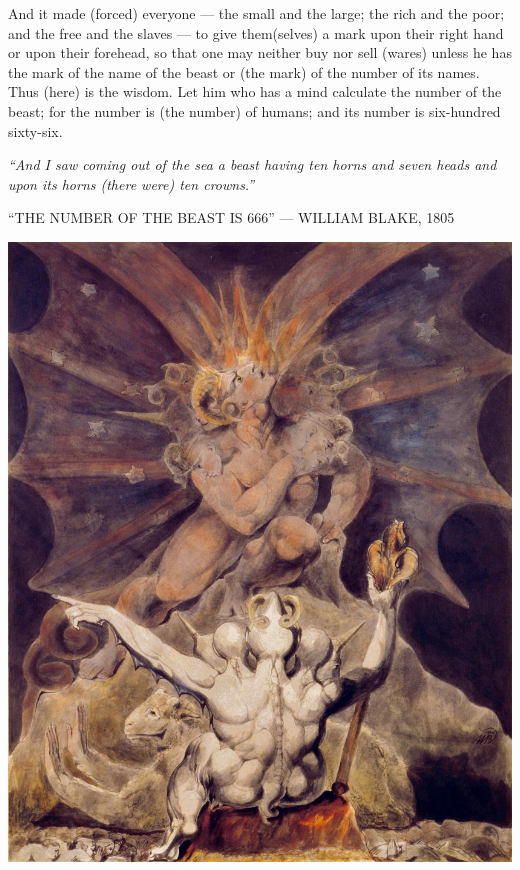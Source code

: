 \begin{pages}
\begin{Leftside}
		\pend
		\pstart
		And it made (forced) everyone — the small and the large; the rich and the poor; and the free and the slaves — to give them(selves) a mark upon their right hand or upon their forehead, so that one may neither buy nor sell (wares) unless he has the mark of the name of the beast or (the mark) of the number of its names. Thus (here) is the wisdom. Let him who has a mind calculate the number of the beast; for the number is (the number) of humans; and its number is six-hundred sixty-six. 
		\pend
        \endnumbering
    \end{Leftside}

\end{pages} 
\Pages

\clearpage
\thispagestyle{empty}
\null\vfill
\settowidth{}
\begin{center}
\parbox{\longest}{%
  \raggedright{\huge\itshape%
    ``And I saw coming out of the sea a beast having ten horns and seven heads and upon its horns (there were) ten crowns.'' \par\bigskip
  }
  \raggedleft\Large\MakeUppercase{``The Number of the Beast is 666'' — William Blake, 1805}\par%
}
\vfill\vfill
\clearpage\newpage
\end{center}
\newpage
\thispagestyle{empty}
\begin{center}
	\includegraphics[width=1\textwidth]{images/illustrations/blakebeastnumber}
\end{center}